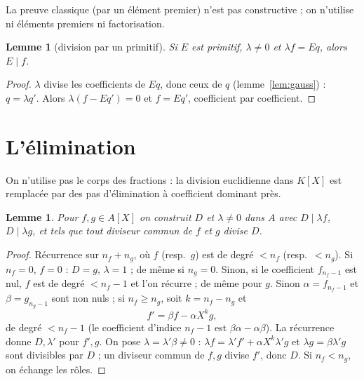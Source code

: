 \documentclass[11pt]{amsart}
\newtheorem{lemma}[theorem]{Lemme}
\theoremstyle{definition}
\theoremstyle{remark}
\begin{document}
La preuve classique (par un élément premier) n'est pas constructive ; on
n'utilise ni éléments premiers ni factorisation.

\begin{lemma}[division par un primitif]\label{lem:G}
Si $E$ est primitif, $\lambda\ne0$ et $\lambda f=Eq$, alors $E\mid f$.
\end{lemma}
\begin{proof}
$\lambda$ divise les coefficients de $Eq$, donc ceux de $q$
(lemme~\ref{lem:gauss}) : $q=\lambda q'$. Alors $\lambda(f-Eq')=0$ et
$f=Eq'$, coefficient par coefficient.
\end{proof}

\section{L'élimination}

On n'utilise pas le corps des fractions : la division euclidienne dans
$K[X]$ est remplacée par des pas d'élimination à coefficient dominant
près.

\begin{lemma}\label{lem:elim}
Pour $f,g\in A[X]$ on construit $D$ et $\lambda\ne0$ dans $A$ avec
$D\mid\lambda f$, $D\mid\lambda g$, et tels que tout diviseur commun de
$f$ et $g$ divise $D$.
\end{lemma}
\begin{proof}
Récurrence sur $n_f+n_g$, où $f$ (resp.\ $g$) est de degré $<n_f$
(resp.\ $<n_g$). Si $n_f=0$, $f=0$ : $D=g$, $\lambda=1$ ; de même si
$n_g=0$. Sinon, si le coefficient $f_{n_f-1}$ est nul, $f$ est de degré
$<n_f-1$ et l'on récurre ; de même pour $g$. Sinon $\alpha=f_{n_f-1}$ et
$\beta=g_{n_g-1}$ sont non nuls ; si $n_f\ge n_g$, soit $k=n_f-n_g$ et
\[
 f'=\beta f-\alpha X^kg ,
\]
de degré $<n_f-1$ (le coefficient d'indice $n_f-1$ est
$\beta\alpha-\alpha\beta$). La récurrence donne $D,\lambda'$ pour $f',g$.
On pose $\lambda=\lambda'\beta\ne0$ : $\lambda f=\lambda'f'+\alpha X^k
\lambda'g$ et $\lambda g=\beta\lambda'g$ sont divisibles par $D$ ; un
diviseur commun de $f,g$ divise $f'$, donc $D$. Si $n_f<n_g$, on échange
les rôles.
\end{proof}
\end{document}
